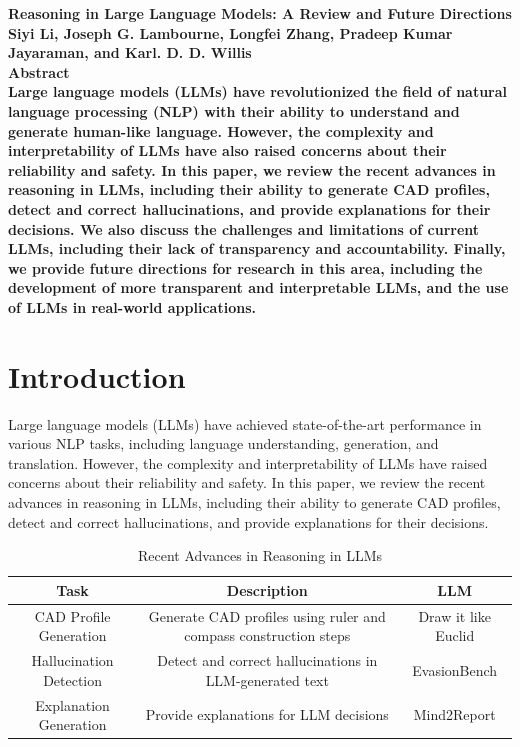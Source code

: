 \documentclass[11pt]{article}
\begin{document}
        \begin{center}
        \textbf{\Large Reasoning in Large Language Models: A Review and Future Directions}\\
        \textbf{\Large Siyi Li, Joseph G. Lambourne, Longfei Zhang, Pradeep Kumar Jayaraman, and Karl. D. D. Willis}\\
        \textbf{\Large Abstract}\\
        \textbf{\Large Large language models (LLMs) have revolutionized the field of natural language processing (NLP) with their ability to understand and generate human-like language. However, the complexity and interpretability of LLMs have also raised concerns about their reliability and safety. In this paper, we review the recent advances in reasoning in LLMs, including their ability to generate CAD profiles, detect and correct hallucinations, and provide explanations for their decisions. We also discuss the challenges and limitations of current LLMs, including their lack of transparency and accountability. Finally, we provide future directions for research in this area, including the development of more transparent and interpretable LLMs, and the use of LLMs in real-world applications.}\\
        \end{center}
        \section{Introduction}
        \label{sec:intro}
        Large language models (LLMs) have achieved state-of-the-art performance in various NLP tasks, including language understanding, generation, and translation. However, the complexity and interpretability of LLMs have raised concerns about their reliability and safety. In this paper, we review the recent advances in reasoning in LLMs, including their ability to generate CAD profiles, detect and correct hallucinations, and provide explanations for their decisions.\\
        \begin{table}[h]
        \centering
        \begin{tabular}{|c|c|c|}
        \hline
        \textbf{Task} & \textbf{Description} & \textbf{LLM} \\
        \hline
        CAD Profile Generation & Generate CAD profiles using ruler and compass construction steps & Draw it like Euclid \cite{li2026drawlikeeuclidteaching} \\
        \hline
        Hallucination Detection & Detect and correct hallucinations in LLM-generated text & EvasionBench \cite{ma2026evasionbenchdetectingevasiveanswers} \\
        \hline
        Explanation Generation & Provide explanations for LLM decisions & Mind2Report \cite{cheng2026mind2reportcognitivedeepresearch} \\
        \hline
        \end{tabular}
        \caption{Recent Advances in Reasoning in LLMs}
        \label{tab:recent-advances}
        \end{table}
\end{document}
